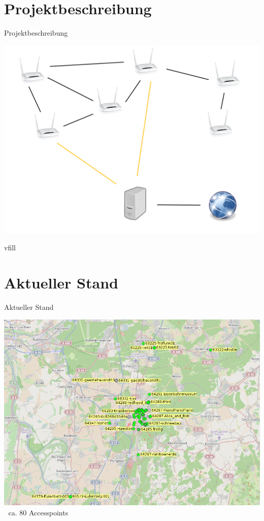 \documentclass{beamer}
\begin{document}
\section{Projektbeschreibung}
\begin{frame}{Projektbeschreibung}
\vfill
\begin{center}
\includegraphics[height=0.7\textheight]{images/meshing}
\end{center}
\vfill
\end{frame}
vfill
\section{Aktueller Stand}
\begin{frame}{Aktueller Stand}
\vfill
\begin{center}
\includegraphics[height=0.75\textheight]{images/2015-01-26-map}$\;$
\vfill
ca. 80 Accesspoints
\end{center}
\end{frame}
\end{document}
